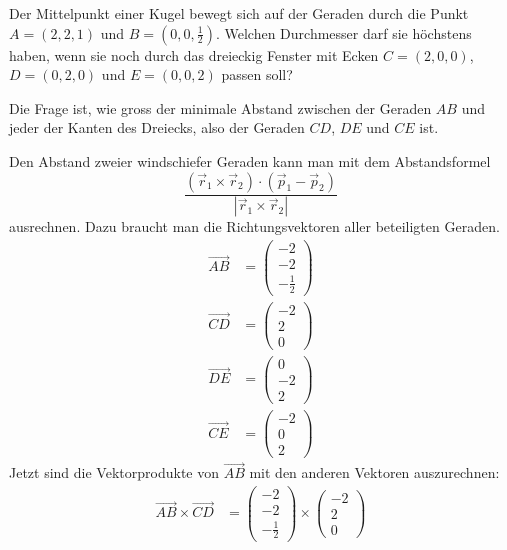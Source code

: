 Der Mittelpunkt einer Kugel bewegt sich auf der Geraden durch
die Punkt $A=(2,2,1)$ und $B=(0,0,\frac12)$. Welchen Durchmesser
darf sie höchstens haben, wenn sie noch durch das dreieckig
Fenster mit Ecken $C=(2,0,0)$, $D=(0,2,0)$ und $E=(0,0,2)$ passen
soll?


\begin{loesung}
Die Frage ist, wie gross der minimale Abstand zwischen
der Geraden $AB$ und jeder der Kanten des Dreiecks, also
der Geraden $CD$, $DE$ und $CE$ ist.

Den Abstand zweier windschiefer Geraden kann man mit dem
Abstandsformel
\[
\frac{(\vec r_1\times \vec r_2)\cdot (\vec p_1-\vec p_2)}{|\vec r_1\times \vec r_2|}
\]
ausrechnen.
Dazu braucht man die Richtungsvektoren aller beteiligten Geraden.
\begin{align*}
\overrightarrow{AB}
&=
\begin{pmatrix} -2\\-2\\-\frac12 \end{pmatrix}
\\
\overrightarrow{CD}
&=
\begin{pmatrix} -2\\2\\0\end{pmatrix}
\\
\overrightarrow{DE}
&=
\begin{pmatrix} 0\\-2\\2\end{pmatrix}
\\
\overrightarrow{CE}
&=
\begin{pmatrix} -2\\0\\2\end{pmatrix}
\end{align*}
Jetzt sind die Vektorprodukte von $\overrightarrow{AB}$ mit den
anderen Vektoren auszurechnen:
\begin{align*}
\overrightarrow{AB}\times\overrightarrow{CD}
&=
\begin{pmatrix} -2\\-2\\-\frac12 \end{pmatrix}
\times
\begin{pmatrix} -2\\2\\0\end{pmatrix}

\end{align*}
\end{loesung}
